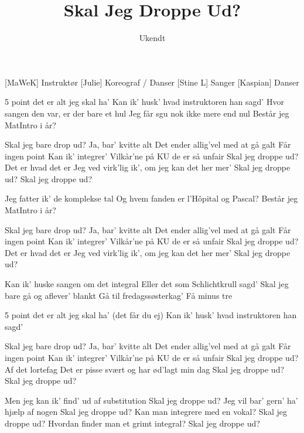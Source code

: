 \documentclass[a4paper,11pt]{article}
\title{Skal Jeg Droppe Ud?}
\author{Ukendt}
\begin{document}
\maketitle

\begin{roles}
[MaWeK] Instruktør
[Julie] Koreograf / Danser
[Stine L] Sanger
[Kaspian] Danser
\end{roles}

\begin{song}
 5 point det er alt jeg skal ha'
Kan ik' husk' hvad instruktoren han sagd'
Hvor sangen den var, er der bare et hul
Jeg får sgu nok ikke mere end nul
Består jeg MatIntro i år?

 Skal jeg bare drop ud?
Ja, bar' kvitte alt
Det ender allig'vel med at gå galt
Får ingen point
Kan ik' integrer'
Vilkår'ne på KU de er så unfair
Skal jeg droppe ud?
Det er hvad det er
Jeg ved virk'lig ik', om jeg kan det her mer'
Skal jeg droppe ud?
Skal jeg droppe ud?

 Jeg fatter ik' de komplekse tal
Og hvem fanden er l'Hôpital og Pascal?
Består jeg MatIntro i år?

 Skal jeg bare drop ud?
Ja, bar' kvitte alt
Det ender allig'vel med at gå galt
Får ingen point
Kan ik' integrer'
Vilkår'ne på KU de er så unfair
Skal jeg droppe ud?
Det er hvad det er
Jeg ved virk'lig ik', om jeg kan det her mer'
Skal jeg droppe ud?

 Kan ik' huske sangen om det integral
Eller det som Schlichtkrull sagd'
Skal jeg bare gå og aflever' blankt
Gå til fredagssøsterkag'
Få minus tre

 5 point det er alt jeg skal ha' (det får du ej)
Kan ik' husk' hvad instruktoren han sagd'

 Skal jeg bare drop ud?
Ja, bar' kvitte alt
Det ender allig'vel med at gå galt
Får ingen point
Kan ik' integrer'
Vilkår'ne på KU de er så unfair
Skal jeg droppe ud?
Af det lortefag
Det er pisse svært og har ød'lagt min dag
Skal jeg droppe ud?
Skal jeg droppe ud?

 Men jeg kan ik' find' ud af substitution
Skal jeg droppe ud?
Jeg vil bar' gern' ha' hjælp af nogen
Skal jeg droppe ud?
Kan man integrere med en vokal?
Skal jeg droppe ud?
Hvordan finder man et grimt integral?
Skal jeg droppe ud?
\end{song}
\end{document}
